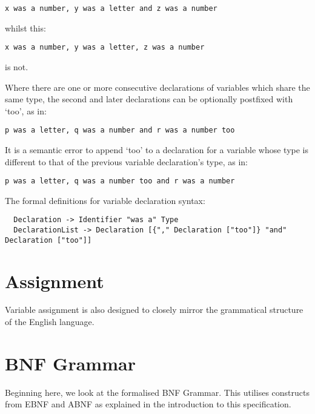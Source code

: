 \documentclass[a4wide, 11pt]{article}
\begin{document}
\begin{verbatim}
x was a number, y was a letter and z was a number
\end{verbatim}

whilst this:

\begin{verbatim}
x was a number, y was a letter, z was a number
\end{verbatim}

is not.

Where there are one or more consecutive declarations of variables which share the same type, the second and later declarations can be optionally postfixed with `too', as in:

\begin{verbatim}
p was a letter, q was a number and r was a number too
\end{verbatim}

It is a semantic error to append `too' to a declaration for a variable whose type is different to that of the previous variable declaration's type, as in:

\begin{verbatim}
p was a letter, q was a number too and r was a number
\end{verbatim}

The formal definitions for variable declaration syntax:

\begin{verbatim}
  Declaration -> Identifier "was a" Type
  DeclarationList -> Declaration [{"," Declaration ["too"]} "and" Declaration ["too"]]
\end{verbatim}

\section{Assignment}

Variable assignment is also designed to closely mirror the grammatical structure of the English language.

\section{BNF Grammar} 

Beginning here, we look at the formalised BNF Grammar. This utilises constructs from EBNF and ABNF as explained in the introduction to this specification.
\end{document}
